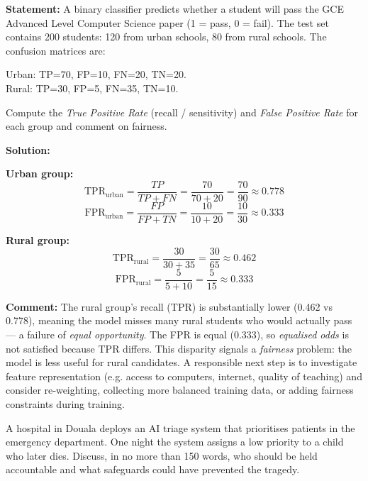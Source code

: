 \documentclass[11pt]{article}
\begin{document}
\begin{exoresolu}
\textbf{Statement:} A binary classifier predicts whether a student will pass the GCE Advanced Level Computer Science paper (1 = pass, 0 = fail). The test set contains 200 students: 120 from urban schools, 80 from rural schools. The confusion matrices are:

Urban: TP=70, FP=10, FN=20, TN=20.\\
Rural: TP=30, FP=5, FN=35, TN=10.

Compute the \emph{True Positive Rate} (recall / sensitivity) and \emph{False Positive Rate} for each group and comment on fairness.

\tcblower
\textbf{Solution:}

\textbf{Urban group:}
\[
\text{TPR}_{\text{urban}} = \frac{TP}{TP+FN} = \frac{70}{70+20} = \frac{70}{90} \approx 0.778
\]
\[
\text{FPR}_{\text{urban}} = \frac{FP}{FP+TN} = \frac{10}{10+20} = \frac{10}{30} \approx 0.333
\]

\textbf{Rural group:}
\[
\text{TPR}_{\text{rural}} = \frac{30}{30+35} = \frac{30}{65} \approx 0.462
\]
\[
\text{FPR}_{\text{rural}} = \frac{5}{5+10} = \frac{5}{15} \approx 0.333
\]

\textbf{Comment:} The rural group’s recall (TPR) is substantially lower (0.462 vs 0.778), meaning the model misses many rural students who would actually pass — a failure of \emph{equal opportunity}. The FPR is equal (0.333), so \emph{equalised odds} is not satisfied because TPR differs. This disparity signals a \emph{fairness} problem: the model is less useful for rural candidates. A responsible next step is to investigate feature representation (e.g. access to computers, internet, quality of teaching) and consider re‑weighting, collecting more balanced training data, or adding fairness constraints during training.
\end{exoresolu}

\begin{exercice}
A hospital in Douala deploys an AI triage system that prioritises patients in the emergency department. One night the system assigns a low priority to a child who later dies. Discuss, in no more than 150 words, who should be held accountable and what safeguards could have prevented the tragedy.
\end{exercice}
\end{document}

